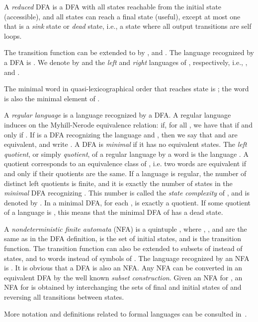 \documentclass{article}
\newcommand{\dfa}{DFA\xspace}
\newcommand{\nfa}{NFA\xspace}
\begin{document}
A \emph{reduced} \dfa is a \dfa with all states reachable from the  
initial state (accessible), and all states can reach a final state 
(useful), except at most one that is a \emph{sink} state or
\emph{dead} state, i.e., a state where all output transitions are self
loops. 


The transition function  can be extended to  by , and
. 
The language recognized by a \dfa  is
.  
We denote by 
 and  the \emph{left} and \emph{right} languages of , respectively,
i.e.,  
, and 
. 

The minimal word in quasi-lexicographical order that reaches state 
is ; the word  is also the minimal element of .

A \emph{regular language} is a language recognized by a \dfa.  
A regular language  
induces on  the Myhill-Nerode equivalence relation:
  if, for all , we have that  if and only if . 
If  is a \dfa recognizing
the language  and  , then we say that  and  are equivalent, 
and write .   
A \dfa is \emph{minimal} if it has no equivalent states.
The \emph{left quotient}, or simply \emph{quotient}, of a regular
language  by a word  is the language . A quotient 
corresponds to an equivalence class of , i.e. two words are equivalent if and only if their quotients are the same. 
If a language  is regular, the number of distinct left quotients is
finite, and it is exactly the number of states in the \emph{minimal} \dfa
recognizing . This number is called the \emph{state complexity} of ,
 and is denoted by . 
In a minimal \dfa, for each ,  is exactly a quotient. 
If some quotient of a language  is , this means that the
minimal \dfa of  has a dead state. 

A \emph{nondeterministic finite automata}  (\nfa) is a quintuple
, where , , and
 are the same as in the \dfa definition,  is the set of
initial states, and  is the
transition function.  
The transition function can also be extended to subsets of  instead
of states, and to words instead of symbols of . 
The language recognized by  an \nfa  is
.  
It is obvious that a \dfa is also an \nfa. 
Any \nfa can be converted in an equivalent \dfa by the well known
\emph{subset construction}. Given an \nfa  for , an \nfa  for  is obtained by interchanging the sets of final and initial states of  and reversing all transitions between states.

More notation and definitions related to formal languages can be consulted in~\cite{sakarovitch09:_elemen_of_autom_theor,yu97:_handb_formal_languag}.
\end{document}
